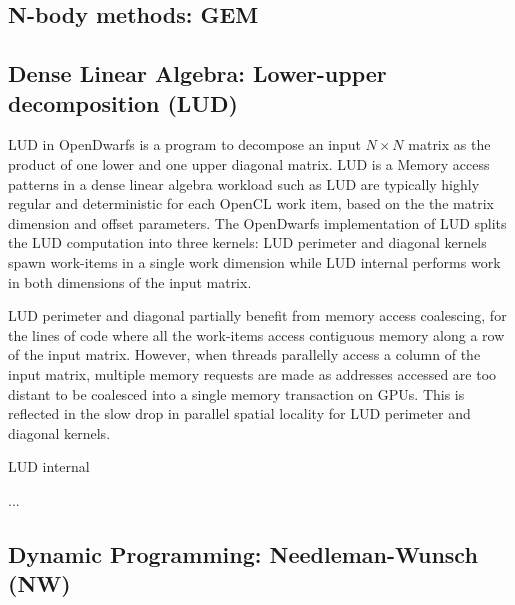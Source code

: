 \documentclass[review=false, sigchi]{acmart}
\begin{document}
	\subsection{N-body methods: GEM}
	
	
	\subsection{Dense Linear Algebra: Lower-upper decomposition (LUD)}
	
	LUD in OpenDwarfs is a program to decompose an input $N\times N$ matrix as the product of one lower and one upper diagonal matrix. LUD is a Memory access patterns in a dense linear algebra workload such as LUD are typically highly regular and deterministic for each OpenCL work item, based on the the matrix dimension and offset parameters. The OpenDwarfs implementation of LUD \cite{opendwarfs2017base} splits the LUD computation into three kernels: LUD perimeter and diagonal kernels spawn work-items in a single work dimension while LUD internal performs work in both dimensions of the input matrix.
	
	LUD perimeter and diagonal partially benefit from memory access coalescing, for the lines of code where all the work-items access contiguous memory along a row of the input matrix. However, when threads parallelly access a column of the input matrix, multiple memory requests are made as addresses accessed are too distant to be coalesced into a single memory transaction on GPUs. This is reflected in the slow drop in parallel spatial locality for LUD perimeter and diagonal kernels.
	
	LUD internal %
	
	
	...  %
	
	\subsection{Dynamic Programming: Needleman-Wunsch (NW)}
	
\end{document}
